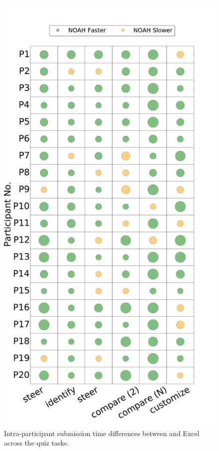 \begin{figure}
    \centering
    \includegraphics[trim=0 0 0 0,clip,width=\linewidth]{images/userinfo-ip.pdf}
\vspace{-20pt}
   \caption{Intra-participant submission time differences between \noah and Excel across the quiz tasks.}
\vspace{-15pt}
   \label{fig:ipdiff}
 \end{figure}
 
